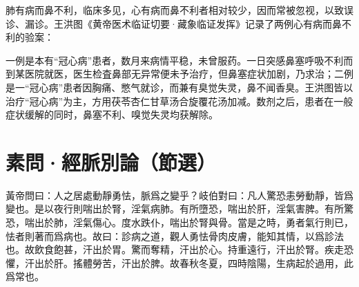 \documentclass[12pt]{ctexbook}
\begin{document}


肺有病而鼻不利，临床多见，心有病而鼻不利者相对较少，因而常被忽视，以致误诊、漏诊。王洪图《黄帝医术临证切要·藏象临证发挥》记录了两例心有病而鼻不利的验案：

一例是本有“冠心病”患者，数月来病情平稳，未曾服药。一日突感鼻塞呼吸不利而到某医院就医，医生检査鼻部无异常便未予治疗，但鼻塞症状加剧，乃求治；二例是一“冠心病”患者因胸痛、憋气就诊，而兼有臭觉失灵，鼻不闻香臭。王洪图皆以治疗“冠心病”为主，方用茯苓杏仁甘草汤合旋覆花汤加减。数剂之后，患者在一般症状缓解的同时，鼻塞不利、嗅觉失灵均获解除。


\section{素問·經脈別論（節選）}%


\begin{yuanwen}
黃帝問曰：人之居處動靜勇怯，脈爲之變乎？岐伯對曰：凡人驚恐恚勞動靜，皆爲變也。是以夜行則喘出於腎，淫氣病肺。有所墮恐，喘出於肝，淫氣害脾。有所驚恐，喘出於肺，淫氣傷心。度水跌仆，喘出於腎與骨。當是之時，勇者氣行則已，怯者則著而爲病也。故曰：診病之道，觀人勇怯骨肉皮膚，能知其情，以爲診法也。故飲食飽甚，汗出於胃。驚而奪精，汗出於心。持重遠行，汗出於腎。疾走恐懼，汗出於肝。搖體勞苦，汗出於脾。故春秋冬夏，四時陰陽，生病起於過用，此爲常也。
\end{yuanwen}

\end{document}

